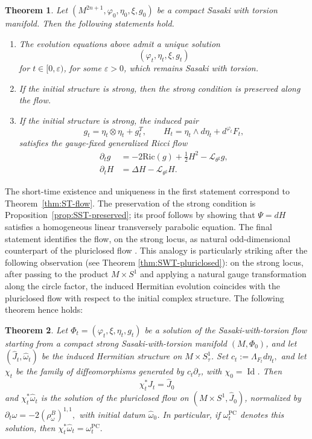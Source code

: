 \documentclass{article}
\newtheorem{thm}{Theorem}[section]
\theoremstyle{definition}
\newcommand{\Ric}{\mathrm{Ric}}
\renewcommand{\phi}{\varphi}
\numberwithin{equation}{section}
\begin{document}
\begin{thm}\label{thm:flow intro}
Let $(M^{2n+1},\phi_0,\eta_0,\xi,g_0)$ be a compact Sasaki with torsion manifold. Then the following statements hold.

\begin{enumerate}
\item The evolution equations above admit a unique solution
\[
(\phi_t,\eta_t,\xi,g_t)
\]
for $t\in[0,\varepsilon)$, for some $\varepsilon>0$, which remains Sasaki with torsion.

\item If the initial structure is strong, then the strong condition is preserved along the flow. 

\item If the initial structure is strong, the induced pair
\[
g_t=\eta_t\otimes\eta_t+g_t^T,
\qquad
H_t=\eta_t\wedge d\eta_t+d^{\phi_t}F_t,
\]
satisfies the gauge-fixed generalized Ricci flow
\[
\begin{aligned}
\partial_tg
&=
-2\Ric(g)+\frac12H^2-\mathcal L_{\theta^\sharp}g,\\
\partial_tH
&=
\Delta H-\mathcal L_{\theta^\sharp}H.
\end{aligned}
\]
\end{enumerate}
\end{thm}

The short-time existence and uniqueness in the first statement correspond to Theorem~\ref{thm:ST-flow}. The preservation of the strong condition is Proposition~\ref{prop:SST-preserved}; its proof follows by showing that $\Psi=dH$ satisfies a homogeneous linear transversely parabolic equation. The final statement identifies the flow, on the strong locus, as natural odd-dimensional counterpart of the pluriclosed flow \cite{StreetsTian, ST2}. This analogy is particularly striking after the following observation (see Theorem \ref{thm:SWT-pluriclosed}): on the strong locus, after passing to the product $M\times S^1$ and applying a natural gauge transformation along the circle factor, the induced Hermitian evolution coincides with the pluriclosed flow with respect to the initial complex structure. The following theorem hence holds: 
\begin{thm}
Let $\Phi_t=(\varphi_t,\xi,\eta_t,g_t)$ be a solution of the
Sasaki-with-torsion flow starting from a compact strong
Sasaki-with-torsion manifold $(M, \Phi_0)$, and let
$(\widehat J_t,\widehat\omega_t)$ be the induced Hermitian structure
on $M\times S^1_{\tau}$. Set $
c_t:=\Lambda_{F_t}d\eta_t,$ 
and let $\chi_t$ be the family of diffeomorphisms generated by
$c_t\partial_\tau$, with $\chi_0=\operatorname{Id}$. Then
\[
\chi_t^*\widehat J_t=\widehat J_0
\]
and $\chi_t^*\widehat\omega_t$ is the solution of the pluriclosed flow
on $(M\times S^1,\widehat J_0)$, normalized by
$
\partial_t\omega
=
-2\left(\rho^B_\omega\right)^{1,1},
$
with initial datum $\widehat\omega_0$. In particular, if
$\omega_t^{\mathrm{PC}}$ denotes this solution, then
$
\chi_t^*\widehat\omega_t=\omega_t^{\mathrm{PC}}.
$
\end{thm}
\end{document}
